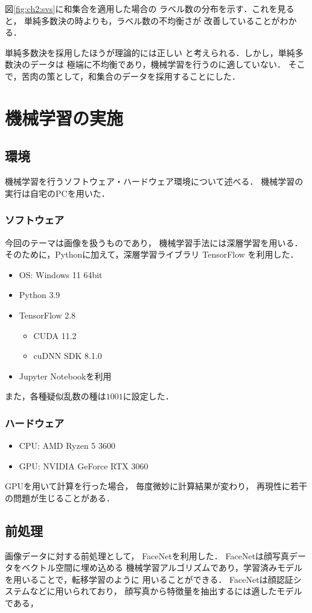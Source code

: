 図\ref{fig:ch2:svs}に和集合を適用した場合の
ラベル数の分布を示す．これを見ると，
単純多数決の時よりも，ラベル数の不均衡さが
改善していることがわかる．

単純多数決を採用したほうが理論的には正しい
と考えられる．しかし，単純多数決のデータは
極端に不均衡であり，機械学習を行うのに適していない．
そこで，苦肉の策として，和集合のデータを採用することにした．

\section{機械学習の実施}
\subsection{環境}
機械学習を行うソフトウェア・ハードウェア環境について述べる．
機械学習の実行は自宅のPCを用いた．
\subsubsection{ソフトウェア}
今回のテーマは画像を扱うものであり，
機械学習手法には深層学習を用いる．
そのために，Pythonに加えて，深層学習ライブラリ
TensorFlow
を利用した．
\begin{itemize}
  \item OS: Windows 11 64bit
  \item Python 3.9
  \item TensorFlow 2.8
  \begin{itemize}
    \item CUDA 11.2
    \item cuDNN SDK 8.1.0
  \end{itemize}
  \item Jupyter Notebookを利用
\end{itemize}
また，各種疑似乱数の種は$1001$に設定した．
\subsubsection{ハードウェア}
\begin{itemize}
  \item CPU: AMD Ryzen 5 3600
  \item GPU: NVIDIA GeForce RTX 3060
\end{itemize}
GPUを用いて計算を行った場合，
毎度微妙に計算結果が変わり，
再現性に若干の問題が生じることがある．
\subsection{前処理}
画像データに対する前処理として，
FaceNet\cite{Schroff_2015_CVPR}を利用した．
FaceNetは顔写真データをベクトル空間に埋め込める
機械学習アルゴリズムであり，学習済みモデルを用いることで，転移学習のように
用いることができる．
FaceNetは顔認証システムなどに用いられており，
顔写真から特徴量を抽出するには適したモデルである，

